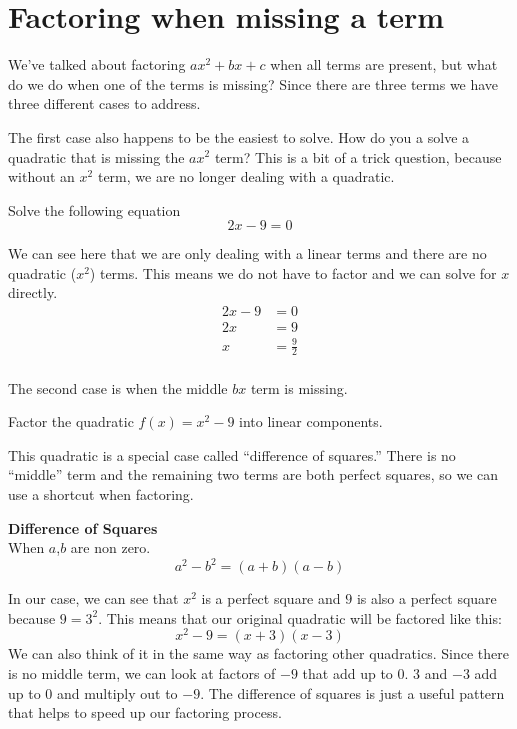 \documentclass{ximera}
\begin{document}
\section{Factoring when missing a term}
We've talked about factoring $ax^2+bx+c$ when all terms are present, but what do we do when one of the terms is missing? Since there are three terms we have three different cases to address.

The first case also happens to be the easiest to solve. How do you a solve a quadratic that is missing the $ax^2$ term? This is a bit of a trick question, because without an $x^2$ term, we are no longer dealing with a quadratic. 
\begin{example}
Solve the following equation
\[
2x-9=0
\]

\begin{explanation}
We can see here that we are only dealing with a linear terms and there are no quadratic ($x^2$) terms. This means we do not have to factor and we can solve for $x$ directly.
\begin{align*}
2x-9&=0\\
2x&=9\\
x&=\frac{9}{2}\\
\end{align*}
\end{explanation}
\end{example}
The second case is when the middle $bx$ term is missing. 
\begin{example}
Factor the quadratic $f(x)=x^2-9$ into linear components.\\

\begin{explanation}
This quadratic is a special case called ``difference of squares.'' There is no ``middle'' term and the remaining two terms are both perfect squares, so we can use a shortcut when factoring.
\begin{callout}
\textbf{Difference of Squares}\\
When $a$,$b$ are non zero.
\[
a^2-b^2=(a+b)(a-b)
\]
\end{callout}
In our case, we can see that $x^2$ is a perfect square and $9$ is also a perfect square because $9=3^2$. This means that our original quadratic will be factored like this:
\[
x^2-9=(x+3)(x-3)
\]
We can also think of it in the same way as factoring other quadratics. Since there is no middle term, we can look at factors of $-9$ that add up to $0$. $3$ and $-3$ add up to $0$ and multiply out to $-9$. The difference of squares is just a useful pattern that helps to speed up our factoring process.
\end{explanation}
\end{example}
\end{document}

